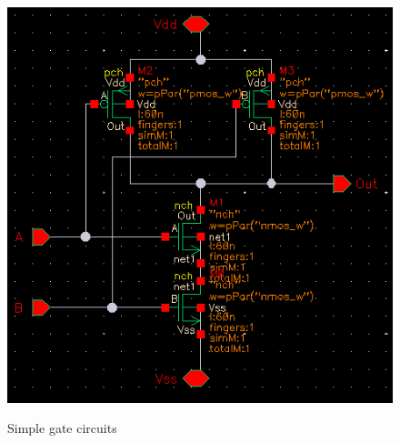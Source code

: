 \begin{figure}[ht]
  {\includegraphics[scale=0.5]{img/nand.png}}
  \caption{Simple gate circuits}
  \label{fig:gates}
\end{figure}